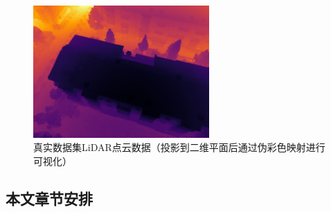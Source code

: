\begin{figure}
    \centering
    \includegraphics[width=0.6\textwidth]{undergraduate-thesis/images/pointcloud.png}
    \caption{真实数据集LiDAR点云数据（投影到二维平面后通过伪彩色映射进行可视化）}
    \label{fig:exp-real-lidar}
\end{figure}

\subsection{本文章节安排}









